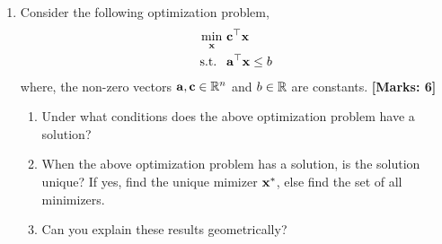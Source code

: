 \documentclass[12pt]{article}
\def\mf{\ensuremath\mathbf}
\def\mb{\ensuremath\mathbb}
\begin{document}
\begin{enumerate}
    \item Consider the following optimization problem,
    \[  \begin{split}
        \min_{\mf{x}} &\,\, \mf{c}^\top\mf{x} \\
        \text{s.t. } &\,\, \mf{a}^\top \mf{x} \leq b
        \end{split} \]
    where, the non-zero vectors $\mf{a}, \mf{c} \in \mb{R}^n$ and $b \in \mb{R}$ are constants.  \textbf{[Marks: 6]}
    \begin{enumerate}
        \item Under what conditions does the above optimization problem have a solution?
        \item When the above optimization problem has a solution, is the solution unique? If yes, find the unique mimizer $\mf{x}^*$, else find the set of all minimizers.
        \item Can you explain these results geometrically?
    \end{enumerate}
\end{enumerate}
\end{document}
